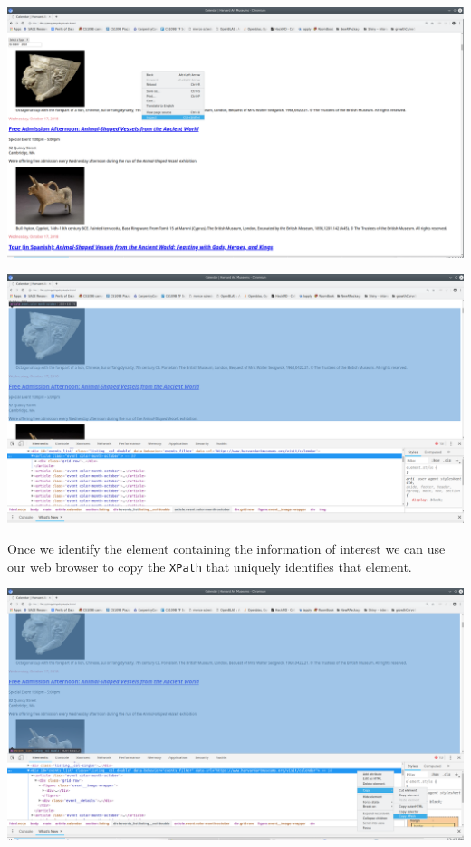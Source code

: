 \documentclass[
]{book}
\begin{document}
\includegraphics{Python/PythonWebScrape/images/dev_tools_right_click.png}

\includegraphics{Python/PythonWebScrape/images/dev_tools_inspect.png}

Once we identify the element containing the information of interest we can use our web browser to copy the \texttt{XPath} that uniquely identifies that element.

\includegraphics{Python/PythonWebScrape/images/dev_tools_xpath.png}
\end{document}
